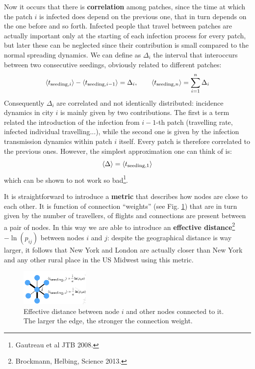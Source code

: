 \documentclass[../main/main.tex]{subfiles}
\begin{document}
Now it occurs that there is \textbf{correlation} among patches, since the time at which the patch $i$ is infected does depend on the previous one, that in turn depends on the one before and so forth. Infected people that travel between patches are actually important only at the starting of each infection process for every patch, but later these can be neglected since their contribution is small compared to the normal spreading dynamics. We can define as $\Delta_i$ the interval that interoccurs between two consecutive seedings, obviously related to different patches:
\begin{equation}
    \expval{t_{\text{seeding}, i}} - \expval{t_{\text{seeding}, i - 1}} = \Delta_i, \qquad \expval{t_{\text{seeding}, n}} = \sum_{i=1}^n \Delta_i
\end{equation}
Consequently $\Delta_i$ are correlated and not identically distributed: incidence dynamics in city $i$ is mainly given by two contributions. The first is a term related the introduction of the infection from $i-1$-th patch (travelling rate, infected individual travelling...), while the second one is given by the infection transmission dynamics within patch $i$ itself. Every patch is therefore correlated to the previous ones. However, the simplest approximation one can think of is:
\begin{equation*}
    \expval{\Delta} = \expval{t_{\text{seeding}, 1}}
\end{equation*}
which can be shown to not work so bad\footnote{Gautreau et al JTB 2008.}.

It is straightforward to introduce a \textbf{metric} that describes how nodes are close to each other. It is function of connection “weights” (see Fig. \ref{fig:14_03}) that are in turn given by the number of travellers, of flights and connections are present between a pair of nodes. In this way we are able to introduce an \textbf{effective distance}\footnote{Brockmann, Helbing, Science 2013.}  $- \ln(p_{ij})$  between nodes $i$ and $j$: despite the geographical distance is way larger, it follows that New York and London are actually closer than New York and any other rural place in the US Midwest using this metric.

\begin{figure}[h!]
\centering
\includegraphics[width=0.3\textwidth]{../lessons/image/15/image03.png}
\caption{\label{fig:14_03} Effective distance between node $i$ and other nodes connected to it. The larger the edge, the stronger the connection weight.}
\end{figure}
\end{document}
